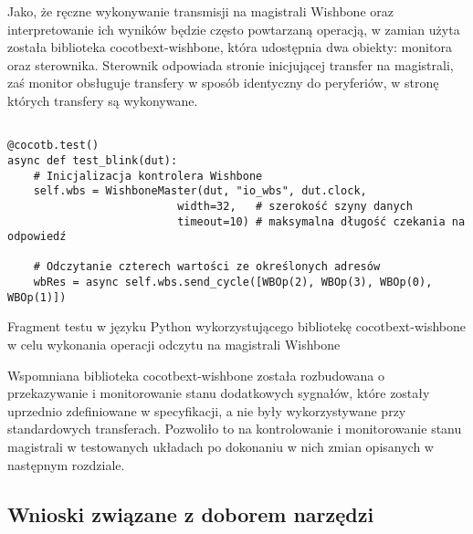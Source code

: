 Jako, że ręczne wykonywanie transmisji na magistrali Wishbone oraz interpretowanie ich wyników będzie często powtarzaną operacją, w zamian użyta została biblioteka cocotbext-wishbone, która udostępnia dwa obiekty: monitora oraz sterownika. Sterownik odpowiada stronie inicjującej transfer na magistrali, zaś monitor obsługuje transfery w sposób identyczny do peryferiów, w stronę których transfery są wykonywane.

\begin{listing}[H]
\begin{verbatim}

@cocotb.test()
async def test_blink(dut):
    # Inicjalizacja kontrolera Wishbone
    self.wbs = WishboneMaster(dut, "io_wbs", dut.clock,
                          width=32,   # szerokość szyny danych
                          timeout=10) # maksymalna długość czekania na odpowiedź

    # Odczytanie czterech wartości ze określonych adresów
    wbRes = async self.wbs.send_cycle([WBOp(2), WBOp(3), WBOp(0), WBOp(1)])
\end{verbatim}
\caption{\label{lst:tooling-cocotbext-wishbone-example}Fragment testu w języku Python wykorzystującego bibliotekę cocotbext-wishbone w celu wykonania operacji odczytu na magistrali Wishbone}
\end{listing}

Wspomniana biblioteka cocotbext-wishbone została rozbudowana o przekazywanie i monitorowanie stanu dodatkowych sygnałów, które zostały uprzednio zdefiniowane w specyfikacji, a nie były wykorzystywane przy standardowych transferach. Pozwoliło to na kontrolowanie i monitorowanie stanu magistrali w testowanych układach po dokonaniu w nich zmian opisanych w następnym rozdziale.

\subsection{Wnioski związane z doborem narzędzi}
